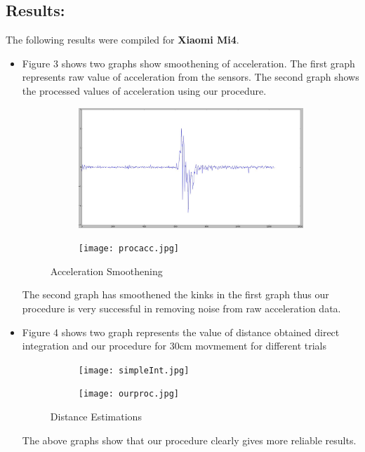 \documentclass{article}
\begin{document}
		\subsection{Results:}
			The following results were compiled for \textbf{Xiaomi Mi4}.

			\begin{itemize}
			\item Figure 3 shows two graphs show smoothening of acceleration. The first graph represents raw value of acceleration from the sensors. The second graph shows the processed values of acceleration using our procedure.
    		\begin{figure}[H]
					\centering
					\begin{subfigure}{.5\textwidth}
					  	\centering
					  	\includegraphics[width=1.0\linewidth]{rawacc.jpg}
					  	\caption{}
					  	\label{fig:sub1}
					\end{subfigure}%
					\begin{subfigure}{.5\textwidth}
					  	\centering
					  	\texttt{[image: procacc.jpg]}
					  	\caption{}
					  	\label{fig:sub2}
					\end{subfigure}
					\caption{Acceleration Smoothening}
					\label{figstart}
			\end{figure}
			The second graph has smoothened the kinks in the first graph thus our procedure is very successful in removing noise from raw acceleration data.

			\item Figure 4 shows two graph represents the value of distance obtained direct integration and our procedure for 30cm movmement for different trials
				\begin{figure}[H]
					\centering
					\begin{subfigure}{.5\textwidth}
					  	\centering
					  	\texttt{[image: simpleInt.jpg]}
					  	\caption{}
					  	\label{fig:sub1}
					\end{subfigure}%
					\begin{subfigure}{.5\textwidth}
					  	\centering
					  	\texttt{[image: ourproc.jpg]}
					  	\caption{}
					  	\label{fig:sub2}
					\end{subfigure}
					\caption{Distance Estimations}
					\label{figstart}
			\end{figure}
			The above graphs show that our procedure clearly gives more reliable results.


\end{itemize}
\end{document}
